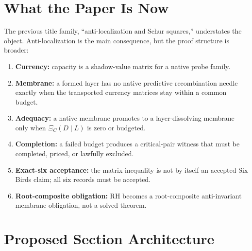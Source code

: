 \documentclass[11pt]{article}
\begin{document}
\section{What the Paper Is Now}

The previous title family, ``anti-localization and Schur squares,'' understates the object.  Anti-localization is the main consequence, but the proof structure is broader:
\begin{enumerate}[label=(\roman*)]
\item \textbf{Currency:} capacity is a shadow-value matrix for a native probe family.
\item \textbf{Membrane:} a formed layer has no native predictive recombination needle exactly when the transported currency matrices stay within a common budget.
\item \textbf{Adequacy:} a native membrane promotes to a layer-dissolving membrane only when $\Xi_C(D\mid L)$ is zero or budgeted.
\item \textbf{Completion:} a failed budget produces a critical-pair witness that must be completed, priced, or lawfully excluded.
\item \textbf{Exact-six acceptance:} the matrix inequality is not by itself an accepted Six Birds claim; all six records must be accepted.
\item \textbf{Root-composite obligation:} RH becomes a root-composite anti-invariant membrane obligation, not a solved theorem.
\end{enumerate}

\section{Proposed Section Architecture}
\end{document}
